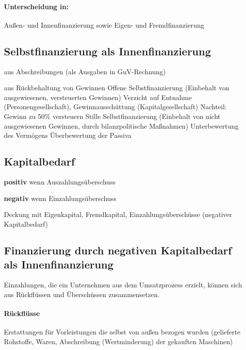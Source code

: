 \paragraph{Unterscheidung in:} Außen- und Innenfinanzierung sowie Eigen- und Fremdfinanzierung


\clearpage
\subsection{Selbstfinanzierung als Innenfinanzierung}
\begin{compactitem}
	\item aus Abschreibungen (als Ausgaben in GuV-Rechnung)
	\item aus Rückbehaltung von Gewinnen
	\subitem Offene Selbstfinanzierung (Einbehalt von ausgewiesenen, versteuerten Gewinnen)
	\subsubitem Verzicht auf Entnahme (Personengesellschaft), Gewinnausschüttung (Kapitalgesellschaft)
	\subsubitem Nachteil: Gewinn zu 50\% versteuern
	\subitem Stille Selbstfinanzierung (Einbehalt von nicht ausgewiesenen Gewinnen, durch bilanzpolitische Maßnahmen)
	\subsubitem Unterbewertung des Vermögens
	\subsubitem Überbewertung der Passiva
\end{compactitem}

\clearpage
\subsection{Kapitalbedarf}
\begin{compactitem}
	\item {\bf positiv} wenn Auszahlungsüberschuss
	\item {\bf negativ} wenn Einzahlungsüberschuss
\end{compactitem}

Deckung mit Eigenkapital, Fremdkapital, Einzahlungsüberschüsse (negativer Kapitalbedarf)

\clearpage
\subsection{Finanzierung durch negativen Kapitalbedarf als Innenfinanzierung}
Einzahlungen, die ein Unternehmen aus dem Umsatzprozess erzielt, können sich aus Rückflüssen und Überschüssen zusammensetzen.

\paragraph{Rückflüsse}
Erstattungen für Vorleistungen die selbst von außen bezogen wurden (gelieferte Rohstoffe, Waren, Abschreibung (Wertminderung) der gekauften Maschinen)

